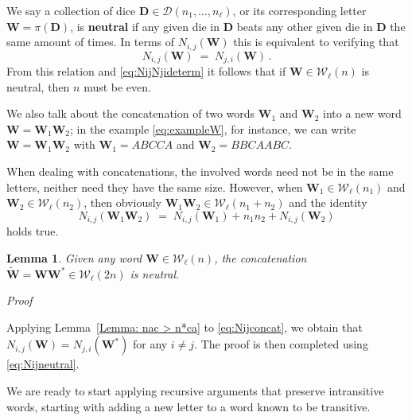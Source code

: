 \documentclass[reqno,a4paper,11pt]{amsart}
\makeatletter
\newtheorem{lemma}{Lemma}
\theoremstyle{remark}
\newcommand{\mc}[1]{{\mathcal #1}}
\newcommand{\mb}[1]{{\mathbf #1}}
\numberwithin{equation}{section}
\renewenvironment{proof}[1][Proof]{\par
\pushQED{\qed}%
\normalfont \topsep6\p@\@plus6\p@\relax
\trivlist
\item\relax
{\itshape
#1\@addpunct{.}}\hspace\labelsep\ignorespaces
}{%
\popQED\endtrivlist\@endpefalse
}
\makeatother
\begin{document}
We say a collection of dice $\mb D\in \mc D(n_1,\hdots,n_\ell)$, or its corresponding letter $\mb W=\pi(\mb D)$, is {\bf neutral} if any given die in $\mb D$ beats any other given die in $\mb D$ the same amount of times. In terms of $N_{i,j}(\mb W)$ this is equivalent to verifying that
%
\begin{equation}\label{eq:Nijneutral}
N_{i,j}(\mb W)\;=\;N_{j,i}(\mb W)\,.
\end{equation}
%
From this relation and \eqref{eq:NijNjideterm} it follows that if $\mb W\in \mc W_\ell(n)$ is neutral, then $n$ must be even.

We also talk about the concatenation of two words $\mb W_1$ and $\mb W_2$ into a new word $\mb W=\mb W_1\mb W_2$; in the example \eqref{eq:exampleW}, for instance, we can write $\mb W=\mb W_1\mb W_2$ with $\mb W_1=ABCCA$ and $\mb W_2=BBCAABC$.

When dealing with concatenations, the involved words need not be in the same letters, neither need they have the same size. However, when $\mb W_1\in \mc W_\ell(n_1)$ and $\mb W_2\in \mc W_\ell(n_2)$, then obviously $\mb W_1\mb W_2\in \mc W_\ell(n_1+n_2)$ and the identity
%
\begin{equation}\label{eq:Nijconcat}
N_{i,j}(\mb W_1\mb W_2)\;=\;N_{i,j}(\mb W_1)+n_1n_2+N_{i,j}(\mb W_2)
\end{equation}
%
holds true.

\begin{lemma}\label{lemma: symmetric neutral}
Given any word $\mb W\in \mc W_{\ell}(n)$, the concatenation $\widetilde{\mb W}=\mb W\mb W^* \in \mc W_{\ell}(2n)$ is neutral.
\end{lemma}
\begin{proof}
Applying Lemma~\ref{Lemma: nac > n*ca} to \eqref{eq:Nijconcat}, we obtain that $N_{i,j}(\mb W)=N_{j,i}(\mb W^*)$ for any $i\neq j$. The proof is then completed using \eqref{eq:Nijneutral}.
\end{proof}

We are ready to start applying recursive arguments that preserve intransitive words, starting with adding a new letter to a word known to be transitive.
\end{document}
